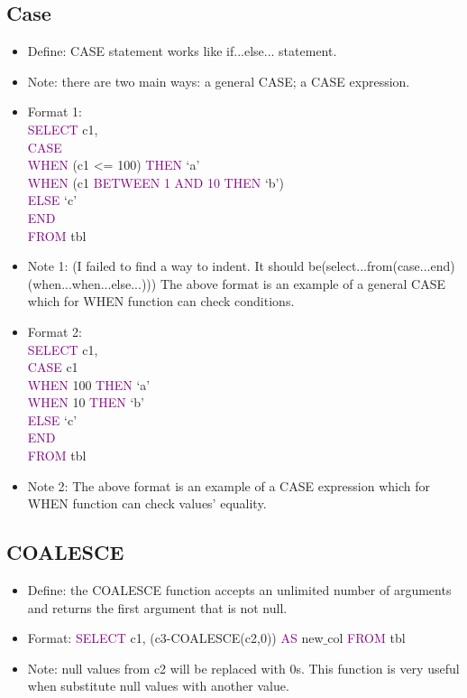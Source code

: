 \documentclass[a4paper]{article}
\begin{document}
\subsection{Case}
\begin{itemize}
  \item Define: CASE statement works like if...else... statement. 
  \item Note: there are two main ways: a general CASE; a CASE expression.
  \item Format 1: \\
  \textcolor{purple}{SELECT} c1,
  \\\textcolor{purple}{CASE}\\\textcolor{purple}{WHEN} (c1 <= 100) \textcolor{purple}{THEN} `a'\\\textcolor{purple}{WHEN} (c1 \textcolor{purple}{BETWEEN 1 AND 10} \textcolor{purple}{THEN} `b')\\\textcolor{purple}{ELSE} `c'\\\textcolor{purple}{END}\\\textcolor{purple}{FROM} tbl
  \item Note 1: (I failed to find a way to indent. It should be(select...from(case...end)(when...when...else...))) The above format is an example of a general CASE which for WHEN function can check conditions.
  \item Format 2: \\
  \textcolor{purple}{SELECT} c1,
  \\\textcolor{purple}{CASE} c1\\\textcolor{purple}{WHEN} 100 \textcolor{purple}{THEN} `a'\\\textcolor{purple}{WHEN} 10 \textcolor{purple}{THEN} `b'\\\textcolor{purple}{ELSE} `c'\\\textcolor{purple}{END}\\\textcolor{purple}{FROM} tbl
  \item Note 2: The above format is an example of a CASE expression which for WHEN function can check values' equality.
\end{itemize}

\subsection{COALESCE}
\begin{itemize}
  \item Define: the COALESCE function accepts an unlimited number of arguments and returns the first argument that is not null. 
  \item Format: \textcolor{purple}{SELECT} c1, (c3-COALESCE(c2,0)) \textcolor{purple}{AS} new$\_$col \textcolor{purple}{FROM} tbl  
  \item Note: null values from c2 will be replaced with 0s. This function is very useful when substitute null values with another value.
\end{itemize}
\end{document}
